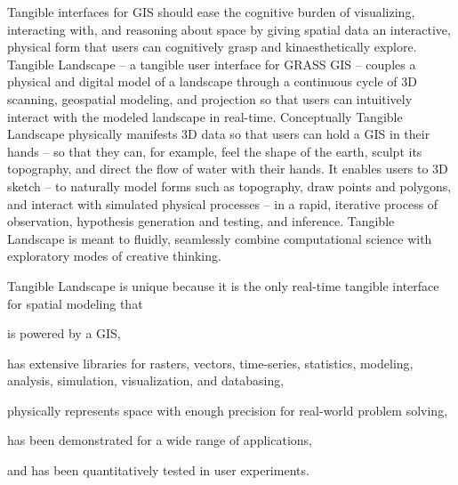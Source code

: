 \documentclass[prodmode,acmtochi]{acmsmall} %
\begin{document}

Tangible interfaces for GIS 
should ease the cognitive burden of 
visualizing, interacting with, 
and reasoning about space
by giving spatial data an interactive, physical form 
that users can cognitively grasp and kinaesthetically explore. 
%
Tangible Landscape -- a tangible user interface for GRASS GIS --
couples a physical and digital model of a landscape through a continuous cycle of 3D scanning, geospatial modeling, and projection
so that users can intuitively interact with the modeled landscape in real-time.
%
Conceptually Tangible Landscape physically manifests 3D data 
so that users can hold a GIS in their hands -- 
so that they can, for example, feel the shape of the earth, sculpt its topography, and direct the flow of water with their hands.
%
It enables users to 3D sketch -- 
to naturally model forms such as topography, 
draw points and polygons, 
and interact with simulated physical processes -- 
in a rapid, iterative process 
of observation, hypothesis generation and testing, and inference. 
%
Tangible Landscape is meant to fluidly, seamlessly combine
computational science with exploratory modes of creative thinking.

Tangible Landscape is unique because it is the only 
real-time tangible interface for spatial modeling that 
\begin{enumerate*}
\item is powered by a GIS,
\item has extensive libraries for rasters, vectors, time-series, statistics, modeling, analysis, simulation, visualization, and databasing, 
\item physically represents space with enough precision for real-world problem solving,
\item has been demonstrated for a wide range of applications,
\item and has been quantitatively tested in user experiments. 
\end{enumerate*}
\end{document}
